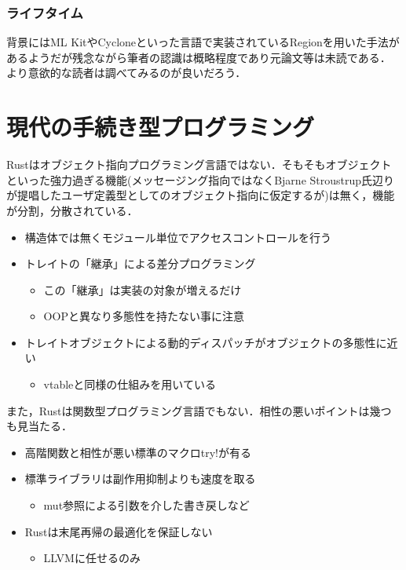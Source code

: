 \subsubsection{ライフタイム}
背景にはML KitやCycloneといった言語で実装されているRegionを用いた手法があるようだが残念ながら筆者の認識は概略程度であり元論文等は未読である．
より意欲的な読者は調べてみるのが良いだろう．


\section{現代の手続き型プログラミング}
Rustはオブジェクト指向プログラミング言語ではない．そもそもオブジェクトといった強力過ぎる機能(メッセージング指向ではなくBjarne Stroustrup氏辺りが提唱したユーザ定義型としてのオブジェクト指向に仮定するが)は無く，機能が分割，分散されている．
\begin{itemize}
\item 構造体では無くモジュール単位でアクセスコントロールを行う
\item トレイトの「継承」による差分プログラミング
  \begin{itemize}
  \item この「継承」は実装の対象が増えるだけ
  \item OOPと異なり多態性を持たない事に注意
  \end{itemize}
\item トレイトオブジェクトによる動的ディスパッチがオブジェクトの多態性に近い
  \begin{itemize}
  \item vtableと同様の仕組みを用いている
  \end{itemize}
\end{itemize}
また，Rustは関数型プログラミング言語でもない．相性の悪いポイントは幾つも見当たる．
\begin{itemize}
\item 高階関数と相性が悪い標準のマクロtry!が有る
\item 標準ライブラリは副作用抑制よりも速度を取る
  \begin{itemize}
  \item mut参照による引数を介した書き戻しなど
  \end{itemize}
\item Rustは末尾再帰の最適化を保証しない
  \begin{itemize}
  \item LLVMに任せるのみ
  \end{itemize}
\end{itemize}

